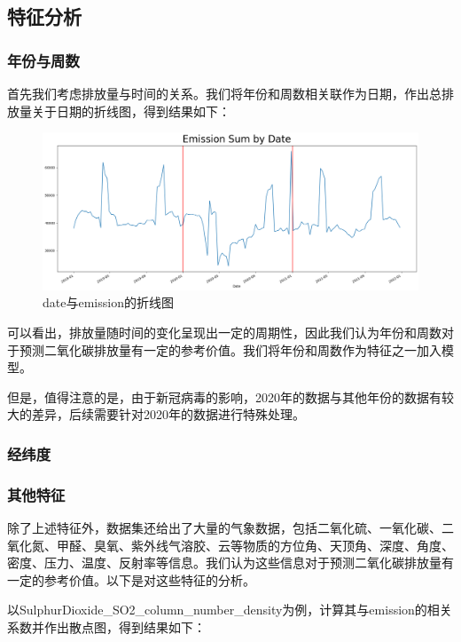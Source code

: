 \documentclass[fontset=windows]{article}
\begin{document}
\subsection{特征分析}

\subsubsection{年份与周数}

首先我们考虑排放量与时间的关系。我们将年份和周数相关联作为日期，作出总排放量关于日期的折线图，得到结果如下：

\begin{figure}[H]
      \centering
      \includegraphics[width=1\textwidth]{output2.png}
      \caption{date与emission的折线图}
\end{figure}

可以看出，排放量随时间的变化呈现出一定的周期性，因此我们认为年份和周数对于预测二氧化碳排放量有一定的参考价值。我们将年份和周数作为特征之一加入模型。

但是，值得注意的是，由于新冠病毒的影响，2020年的数据与其他年份的数据有较大的差异，后续需要针对2020年的数据进行特殊处理。

\subsubsection{经纬度}

\subsubsection{其他特征}

除了上述特征外，数据集还给出了大量的气象数据，包括二氧化硫、一氧化碳、二氧化氮、甲醛、臭氧、紫外线气溶胶、云等物质的方位角、天顶角、深度、角度、密度、压力、温度、反射率等信息。我们认为这些信息对于预测二氧化碳排放量有一定的参考价值。以下是对这些特征的分析。

以SulphurDioxide\_SO2\_column\_number\_density为例，计算其与emission的相关系数并作出散点图，得到结果如下：
\end{document}
